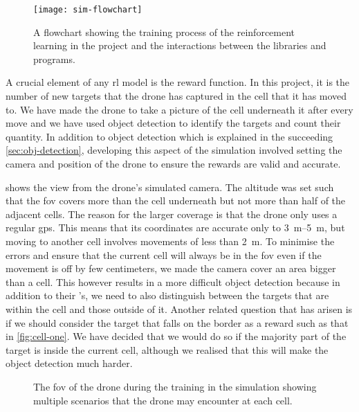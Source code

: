 \documentclass[../main.tex]{subfiles}
\begin{document}
\begin{figure}[p]
    \centering
    \texttt{[image: sim-flowchart]}
    \caption{A flowchart showing the training process
        of the reinforcement learning in the project
        and the interactions between the libraries
        and programs.}
    \label{fig:sim-flowchart}
\end{figure}

A crucial element of any \gls{rl} model
is the reward function. In this project, it
is the number of new targets that the drone has captured
in the cell that it has moved to. We have made the drone
to take a picture of the cell underneath it after 
every move and we have used object detection to
identify the targets and count their quantity. 
In addition to object detection which is explained
in the succeeding \cref{sec:obj-detection}, developing this
aspect of the simulation involved 
setting the camera and position of the drone to ensure
the rewards are valid and accurate.

 shows the view from the drone's
simulated camera. The altitude was set such that
the \gls{fov} covers more than the cell underneath
but not more than half of the adjacent cells.
The reason for the larger coverage is that
the \anafi drone only uses a regular \gls{gps}.
This means that its coordinates are accurate only
to \SIrange{3}{5}{\meter}, but moving to another
cell involves
movements of less than \SI{2}{\meter}.
To minimise the errors and ensure that the current
cell will always be in the \gls{fov} even if the
movement is off by few centimeters, we made the camera
cover an area bigger than a cell. 
This however results in a more difficult
object detection because in addition to their 
\id's, we need to also distinguish between
the targets that are within the cell and 
those outside of it.
Another related question that has arisen is if we 
should consider the target that falls on the border 
as a reward such as that in \cref{fig:cell-one}. 
We have decided that we would do so if
the majority part of the target is inside the current
cell, although we realised that this will make the
object detection much harder.

\begin{figure}[tb]%
    \centering
    \hspace{0.2cm}
    \hspace{0.2cm}
    \caption{%
        \protect The \gls{fov} of the \anafi drone
        during the training in the simulation
        showing multiple scenarios that the drone
        may encounter at each cell.}%
    \label{fig:fov}%
\end{figure}
\end{document}
